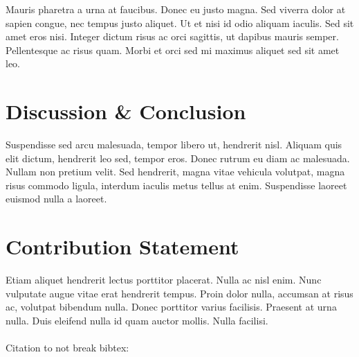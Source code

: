 \documentclass{article}
\theoremstyle{plain}
\theoremstyle{definition}
\theoremstyle{remark}
\begin{document}
Mauris pharetra a urna at faucibus. Donec eu justo magna. Sed viverra dolor at sapien congue, nec tempus justo aliquet. Ut et nisi id odio aliquam iaculis. Sed sit amet eros nisi. Integer dictum risus ac orci sagittis, ut dapibus mauris semper. Pellentesque ac risus quam. Morbi et orci sed mi maximus aliquet sed sit amet leo. 



\section{Discussion \& Conclusion}\label{sec:conclusion}


Suspendisse sed arcu malesuada, tempor libero ut, hendrerit nisl. Aliquam quis elit dictum, hendrerit leo sed, tempor eros. Donec rutrum eu diam ac malesuada. Nullam non pretium velit. Sed hendrerit, magna vitae vehicula volutpat, magna risus commodo ligula, interdum iaculis metus tellus at enim. Suspendisse laoreet euismod nulla a laoreet.



\section*{Contribution Statement}

Etiam aliquet hendrerit lectus porttitor placerat. Nulla ac nisl enim. Nunc vulputate augue vitae erat hendrerit tempus. Proin dolor nulla, accumsan at risus ac, volutpat bibendum nulla. Donec porttitor varius facilisis. Praesent at urna nulla. Duis eleifend nulla id quam auctor mollis. Nulla facilisi.\\
\\
Citation to not break bibtex: \citep{mackay2003information}
\end{document}
